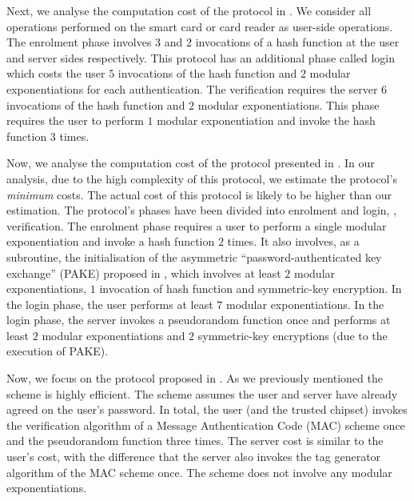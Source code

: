 Next, we analyse the computation cost of the protocol in \cite{WangW18}. We consider all operations performed on the smart card or card reader as user-side operations. The enrolment phase involves $3$ and $2$ invocations of a hash function at the user and server sides respectively. This protocol has an additional phase called login which costs the user  $5$ invocations of the hash function and $2$ modular exponentiations for each authentication.  The verification requires the server $6$ invocations of the hash function and $2$ modular exponentiations. This phase requires the user to perform $1$ modular exponentiation and invoke the hash function $3$ times. 


Now, we analyse the computation cost of the protocol presented in \cite{JareckiJKSS21}. In our analysis, due to the high complexity of this protocol, we estimate the protocol's \emph{minimum} costs. The actual cost of this protocol is likely to be higher than our estimation. The protocol's phases have been divided into enrolment and login, \ie, verification. The enrolment phase requires a user to perform a single modular exponentiation and invoke a hash function $2$ times. It also involves, as a subroutine, the initialisation of the asymmetric  ``password-authenticated key exchange'' (PAKE) proposed in \cite{GentryMR06}, which involves at least $2$ modular exponentiations, $1$ invocation of hash function and symmetric-key encryption. In the login phase, the user performs at least $7$ modular exponentiations. In the login phase, the server invokes a pseudorandom function once and performs at least $2$ modular exponentiations and $2$ symmetric-key encryptions (due to the execution of PAKE). 

Now, we focus on the protocol proposed in \cite{MatsuoMY11}. As we previously mentioned the scheme is highly efficient. The scheme assumes the user and server have already agreed on the user's password. 
%
In total, the user (and the trusted chipset) invokes the verification algorithm of a Message Authentication Code (MAC) scheme once and the pseudorandom function three times. The server cost is similar to the user's cost, with the difference that the server also invokes the tag generator algorithm of the MAC scheme once. The scheme does not involve any modular exponentiations. 



